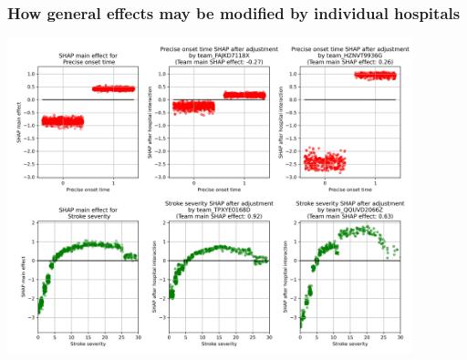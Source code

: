 \begin{frame}
\frametitle{How general effects may be modified by individual hospitals}

\begin{center}
\includegraphics[width=0.88\textwidth]{./images/12aa_two_way_shap_adjustment.jpg}
\end{center}
\end{frame}